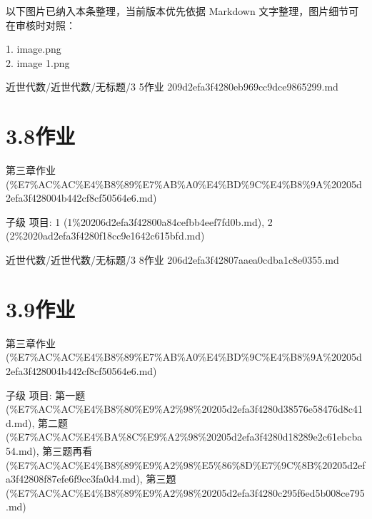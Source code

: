 \begin{note}[关联图片]
以下图片已纳入本条整理，当前版本优先依据 Markdown 文字整理，图片细节可在审核时对照：

1. image.png\\
2. image 1.png\\

\end{note}

\begin{note}[来源路径]

近世代数/近世代数/无标题/3 5作业 209d2efa3f4280eb969cc9dce9865299.md

\end{note}

\section*{3.8作业}

\begin{note}[来源上级主题]

第三章作业 (\%E7\%AC\%AC\%E4\%B8\%89\%E7\%AB\%A0\%E4\%BD\%9C\%E4\%B8\%9A\%20205d2efa3f428004b442cf8cf50564e6.md)

\end{note}

\begin{homework}

子级 项目: 1 (1\%20206d2efa3f42800a84cefbb4eef7fd0b.md), 2 (2\%2020ad2efa3f4280f18cc9e1642c615bfd.md)

\end{homework}

\begin{note}[来源路径]

近世代数/近世代数/无标题/3 8作业 206d2efa3f42807aaea0cdba1c8e0355.md

\end{note}

\section*{3.9作业}

\begin{note}[来源上级主题]

第三章作业 (\%E7\%AC\%AC\%E4\%B8\%89\%E7\%AB\%A0\%E4\%BD\%9C\%E4\%B8\%9A\%20205d2efa3f428004b442cf8cf50564e6.md)

\end{note}

\begin{homework}

子级 项目: 第一题 (\%E7\%AC\%AC\%E4\%B8\%80\%E9\%A2\%98\%20205d2efa3f4280d38576e58476d8c41d.md), 第二题 (\%E7\%AC\%AC\%E4\%BA\%8C\%E9\%A2\%98\%20205d2efa3f4280d18289e2c61ebcba54.md), 第三题再看 (\%E7\%AC\%AC\%E4\%B8\%89\%E9\%A2\%98\%E5\%86\%8D\%E7\%9C\%8B\%20205d2efa3f42808f87efe6f9cc3fa0d4.md), 第三题 (\%E7\%AC\%AC\%E4\%B8\%89\%E9\%A2\%98\%20205d2efa3f4280c295f6ed5b008ce795.md)

\end{homework}

